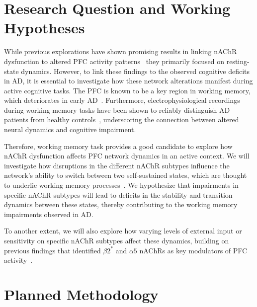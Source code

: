 \documentclass[10pt,letterpaper]{article}
\begin{document}
\section{Research Question and Working Hypotheses}

While previous explorations have shown promising results in linking nAChR dysfunction to altered PFC activity patterns~\citep{Rooy2021,Koukouli2025} they primarily focused on resting-state dynamics. However, to link these findings to the observed cognitive deficits in AD, it is essential to investigate how these network alterations manifest during active cognitive tasks.
The PFC is known to be a key region in working memory, which deteriorates in early AD~\citep{Huntley2010}. Furthermore, electrophysiological recordings during working memory tasks have been shown to reliably distinguish AD patients from healthy controls~\citep{Perpetuini2020}, underscoring the connection between altered neural dynamics and cognitive impairment.

Therefore, working memory task provides a good candidate to explore how nAChR dysfunction affects PFC network dynamics in an active context. We will investigate how disruptions in the different nAChR subtypes influence the network's ability to switch between two self-sustained states, which are thought to underlie working memory processes~\citep{Compte2003}. We hypothesize that impairments in specific nAChR subtypes will lead to deficits in the stability and transition dynamics between these states, thereby contributing to the working memory impairments observed in AD.

To another extent, we will also explore how varying levels of external input or sensitivity on specific nAChR subtypes affect these dynamics, building on previous findings that identified $\beta2^*$ and $\alpha5$ nAChRs as key modulators of PFC activity~\citep{Koukouli2025}.

\section{Planned Methodology}
\end{document}

